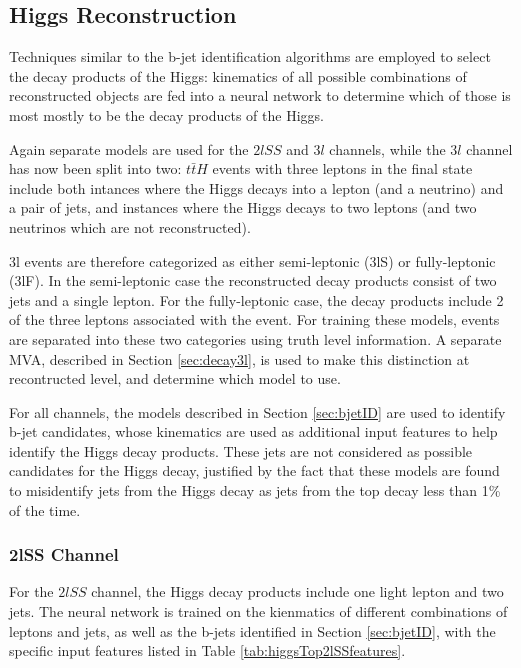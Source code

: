 \subsection{Higgs Reconstruction}
\label{sec:higgsID}

Techniques similar to the b-jet identification algorithms are employed to select the decay products of the Higgs: kinematics of all possible combinations of reconstructed objects are fed into a neural network to determine which of those is most mostly to be the decay products of the Higgs.

Again separate models are used for the $2lSS$ and $3l$  channels, while the $3l$  channel has now been split into two: $t\bar{t}H$ events with three leptons in the final state include both intances where the Higgs decays into a lepton (and a neutrino) and a pair of jets, and instances where the Higgs decays to two leptons (and two neutrinos which are not reconstructed).

3l events are therefore categorized as either semi-leptonic (3lS) or fully-leptonic (3lF). In the semi-leptonic case the reconstructed decay products consist of two jets and a single lepton. For the fully-leptonic case, the decay products include 2 of the three leptons associated with the event. For training these models, events are separated into these two categories using truth level information. A separate MVA, described in Section \ref{sec:decay3l}, is used to make this distinction at recontructed level, and determine which model to use.

For all channels, the models described in Section \ref{sec:bjetID} are used to identify b-jet candidates, whose kinematics are used as additional input features to help identify the Higgs decay products. These jets are not considered as possible candidates for the Higgs decay, justified by the fact that these models are found to misidentify jets from the Higgs decay as jets from the top decay less than 1\% of the time.

\subsubsection{2lSS Channel}
\label{subsec:higgs2lSS}

For the $2lSS$ channel, the Higgs decay products include one light lepton and two jets. The neural network is trained on the kienmatics of different combinations of leptons and jets, as well as the b-jets identified in Section \ref{sec:bjetID}, with the specific input features listed in Table \ref{tab:higgsTop2lSSfeatures}.

